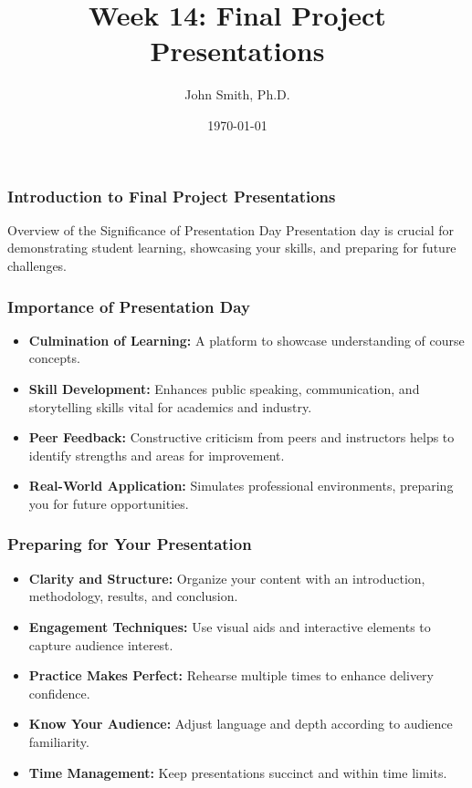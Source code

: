 \documentclass[aspectratio=169]{beamer}
\title[Final Project Presentations]{Week 14: Final Project Presentations}
\author[J. Smith]{John Smith, Ph.D.}
\institute[University Name]{
  Department of Computer Science\\
  University Name\\
  \vspace{0.3cm}
  Email: email@university.edu\\
  Website: www.university.edu
}
\date{\today}
\begin{document}
\frame{\titlepage}

\begin{frame}[fragile]
    \frametitle{Introduction to Final Project Presentations}
    \begin{block}{Overview of the Significance of Presentation Day}
        Presentation day is crucial for demonstrating student learning, showcasing your skills, and preparing for future challenges.
    \end{block}
\end{frame}

\begin{frame}[fragile]
    \frametitle{Importance of Presentation Day}
    \begin{itemize}
        \item \textbf{Culmination of Learning:} A platform to showcase understanding of course concepts.
        \item \textbf{Skill Development:} Enhances public speaking, communication, and storytelling skills vital for academics and industry.
        \item \textbf{Peer Feedback:} Constructive criticism from peers and instructors helps to identify strengths and areas for improvement.
        \item \textbf{Real-World Application:} Simulates professional environments, preparing you for future opportunities.
    \end{itemize}
\end{frame}

\begin{frame}[fragile]
    \frametitle{Preparing for Your Presentation}
    \begin{itemize}
        \item \textbf{Clarity and Structure:} Organize your content with an introduction, methodology, results, and conclusion.
        \item \textbf{Engagement Techniques:} Use visual aids and interactive elements to capture audience interest.
        \item \textbf{Practice Makes Perfect:} Rehearse multiple times to enhance delivery confidence.
        \item \textbf{Know Your Audience:} Adjust language and depth according to audience familiarity.
        \item \textbf{Time Management:} Keep presentations succinct and within time limits.
    \end{itemize}
\end{frame}
\end{document}
